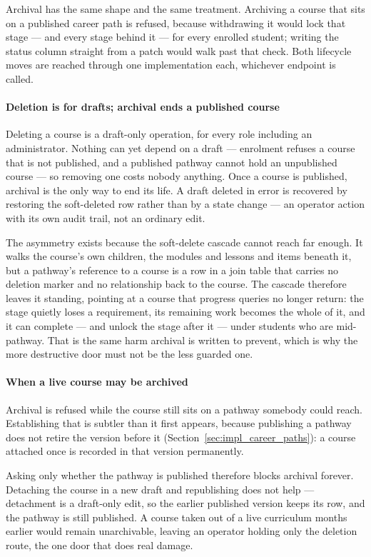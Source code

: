 Archival has the same shape and the same treatment. Archiving a course that sits on a published career path is refused, because withdrawing it would lock that stage --- and every stage behind it --- for every enrolled student; writing the status column straight from a patch would walk past that check. Both lifecycle moves are reached through one implementation each, whichever endpoint is called.

\paragraph{Deletion is for drafts; archival ends a published course}
Deleting a course is a draft-only operation, for every role including an administrator. Nothing can yet depend on a draft --- enrolment refuses a course that is not published, and a published pathway cannot hold an unpublished course --- so removing one costs nobody anything. Once a course is published, archival is the only way to end its life. A draft deleted in error is recovered by restoring the soft-deleted row rather than by a state change --- an operator action with its own audit trail, not an ordinary edit.

The asymmetry exists because the soft-delete cascade cannot reach far enough. It walks the course's own children, the modules and lessons and items beneath it, but a pathway's reference to a course is a row in a join table that carries no deletion marker and no relationship back to the course. The cascade therefore leaves it standing, pointing at a course that progress queries no longer return: the stage quietly loses a requirement, its remaining work becomes the whole of it, and it can complete --- and unlock the stage after it --- under students who are mid-pathway. That is the same harm archival is written to prevent, which is why the more destructive door must not be the less guarded one.

\paragraph{When a live course may be archived}
Archival is refused while the course still sits on a pathway somebody could reach. Establishing that is subtler than it first appears, because publishing a pathway does not retire the version before it (Section~\ref{sec:impl_career_paths}): a course attached once is recorded in that version permanently.

Asking only whether the pathway is published therefore blocks archival forever. Detaching the course in a new draft and republishing does not help --- detachment is a draft-only edit, so the earlier published version keeps its row, and the pathway is still published. A course taken out of a live curriculum months earlier would remain unarchivable, leaving an operator holding only the deletion route, the one door that does real damage.

